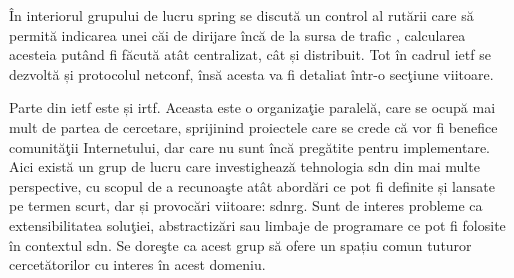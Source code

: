 În interiorul grupului de lucru \gls{spring} se discută un control al rutării care să permită indicarea unei căi de dirijare încă de la sursa de trafic \cite{schneider2014standardizations}, calcularea acesteia putând fi făcută atât centralizat, cât și distribuit. Tot în cadrul \gls{ietf} se dezvoltă și protocolul \gls{netconf}, însă acesta va fi detaliat într-o secţiune viitoare.

Parte din \gls{ietf} este și \gls{irtf}. Aceasta este o organizaţie paralelă, care se ocupă mai mult de partea de cercetare, sprijinind proiectele care se crede că vor fi benefice comunităţii Internetului, dar care nu sunt încă pregătite pentru implementare. Aici există un grup de lucru care investighează tehnologia \gls{sdn} din mai multe perspective, cu scopul de a recunoaşte atât abordări ce pot fi definite și lansate pe termen scurt, dar și provocări viitoare: \gls{sdnrg}. Sunt de interes probleme ca extensibilitatea soluţiei, abstractizări sau limbaje de programare ce pot fi folosite în contextul \gls{sdn}. Se doreşte ca acest grup să ofere un spațiu comun tuturor cercetătorilor cu interes în acest domeniu.

%
%
%
%
%
